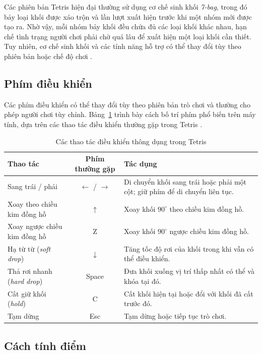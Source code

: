 Các phiên bản Tetris hiện đại thường sử dụng cơ chế sinh khối
\textit{7-bag}, trong đó bảy loại khối được xáo trộn và lần lượt
xuất hiện trước khi một nhóm mới được tạo ra. Nhờ vậy, mỗi nhóm
bảy khối đều chứa đủ các loại khối khác nhau, hạn chế tình trạng
người chơi phải chờ quá lâu để xuất hiện một loại khối cần thiết.
Tuy nhiên, cơ chế sinh khối và các tính năng hỗ trợ có thể thay
đổi tùy theo phiên bản hoặc chế độ chơi
\cite{tetris_randomizer,tetris_guideline}.

\subsection{Phím điều khiển}

Các phím điều khiển có thể thay đổi tùy theo phiên bản trò chơi
và thường cho phép người chơi tùy chỉnh. Bảng~\ref{tab:dieu_khien}
trình bày cách bố trí phím phổ biến trên máy tính, dựa trên các
thao tác điều khiển thường gặp trong Tetris
\cite{tetris_official,tetris_guideline}.

\begin{table}[H]
\centering
\caption{Các thao tác điều khiển thông dụng trong Tetris}
\label{tab:dieu_khien}
\begin{tabular}{>{\raggedright\arraybackslash}p{3.8cm} c >{\raggedright\arraybackslash}p{6.6cm}}
\toprule
\textbf{Thao tác} & \textbf{Phím thường gặp} & \textbf{Tác dụng} \\
\midrule
Sang trái / phải & $\leftarrow$ / $\rightarrow$ & Di chuyển khối sang trái hoặc phải một cột; giữ phím để di chuyển liên tục. \\
Xoay theo chiều kim đồng hồ & $\uparrow$ & Xoay khối $90^\circ$ theo chiều kim đồng hồ. \\
Xoay ngược chiều kim đồng hồ & Z & Xoay khối $90^\circ$ ngược chiều kim đồng hồ. \\
Hạ từ từ (\textit{soft drop}) & $\downarrow$ & Tăng tốc độ rơi của khối trong khi vẫn có thể điều khiển. \\
Thả rơi nhanh (\textit{hard drop}) & Space & Đưa khối xuống vị trí thấp nhất có thể và khóa tại đó. \\
Cất giữ khối (\textit{hold}) & C & Cất khối hiện tại hoặc đổi với khối đã cất trước đó. \\
Tạm dừng & Esc & Tạm dừng hoặc tiếp tục trò chơi. \\
\bottomrule
\end{tabular}
\end{table}

\subsection{Cách tính điểm}

